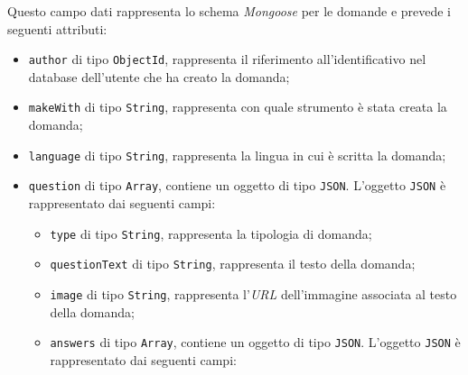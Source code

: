 \begin{itemize}
\begin{itemize}
		Questo campo dati rappresenta lo schema \textit{Mongoose} per le domande e prevede i seguenti attributi:
		\begin{itemize}
			\item \texttt{author} di tipo \texttt{ObjectId}, rappresenta il riferimento all'identificativo nel database dell'utente che ha creato la domanda;
			\item \texttt{makeWith} di tipo \texttt{String}, rappresenta con quale strumento è stata creata la domanda;
			\item \texttt{language} di tipo \texttt{String}, rappresenta la lingua in cui è scritta la domanda; 
			\item \texttt{question} di tipo \texttt{Array}, contiene un oggetto di tipo \texttt{JSON}. L'oggetto \texttt{JSON} è rappresentato dai seguenti campi:
				\begin{itemize}
					\item \texttt{type} di tipo \texttt{String}, rappresenta la tipologia di domanda; 
					\item \texttt{questionText} di tipo \texttt{String}, rappresenta il testo della domanda; 
					\item \texttt{image} di tipo \texttt{String}, rappresenta l'\textit{URL} dell'immagine associata al testo della domanda; 
					\item \texttt{answers} di tipo \texttt{Array}, contiene un oggetto di tipo \texttt{JSON}. L'oggetto \texttt{JSON} è rappresentato dai seguenti campi:
					\begin{enumerate}	
										  

\end{enumerate}
\end{itemize}
\end{itemize}
\end{itemize}
\end{itemize}
